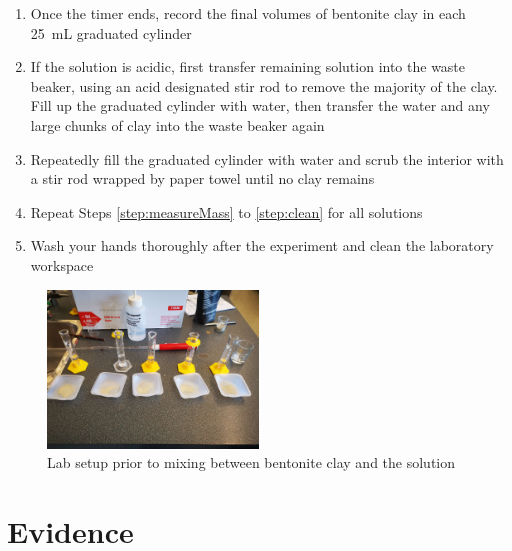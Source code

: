 \documentclass[11pt, letterpaper]{article}
\begin{document}
\begin{enumerate}
    \item Once the timer ends, record the final volumes of bentonite clay in each \SI{25}{mL} graduated cylinder
    \item If the solution is acidic, first transfer remaining solution into the waste beaker, using an acid designated stir rod to remove the majority of the clay. Fill up the graduated cylinder with water, then transfer the water and any large chunks of clay into the waste beaker again
    \item \label{step:clean} Repeatedly fill the graduated cylinder with water and scrub the interior with a stir rod wrapped by paper towel until no clay remains
    \item Repeat Steps \ref*{step:measureMass} to \ref*{step:clean} for all solutions
    \item Wash your hands thoroughly after the experiment and clean the laboratory workspace
\end{enumerate}

\begin{figure}[H]
    \centering
    \includegraphics[width=0.5\textwidth]{labSetup.jpg}
    \caption{Lab setup prior to mixing between bentonite clay and the solution}
    \label{fig:labSetup}
\end{figure}


\section{Evidence}
\end{document}
